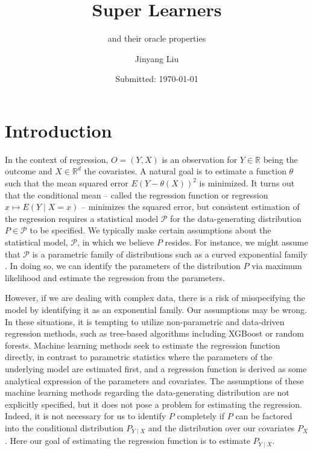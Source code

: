 \documentclass[11pt, a4paper]{article}
\author{Jinyang Liu}
\title{Super Learners}
\subtitle{and their oracle properties}
\date{Submitted: \today}
\theoremstyle{definition}
\theoremstyle{remark}
\begin{document}
\begingroup
    \selectfont %
    \maketitle
    \thispagestyle{empty} 
    
    \newpage
    \thispagestyle{empty} 
    
    \newpage
    \thispagestyle{empty} 
    \tableofcontents
    \newpage
\endgroup

\pagestyle{fancy}
\section{Introduction}
In the context of regression, $ O = (Y, X) $ is an observation for $ Y \in \mathbb{R} $ being the outcome and $ X \in \mathbb{R}^{d} $ the covariates. A natural goal is to estimate a function $ \theta $ such that the mean squared error $ E(Y - \theta(X))^2 $ is minimized. It turns out that the conditional mean -- called the regression function or regression $ x \mapsto E(Y \mid X = x) $ -- minimizes the squared error, but consistent estimation of the regression requires a statistical model $ \mathcal{P} $ for the data-generating distribution $ P \in \mathcal{P} $ to be specified. We typically make certain assumptions about the statistical model, $\mathcal{P}$, in which we believe $P$ resides. For instance, we might assume that $\mathcal{P}$ is a parametric family of distributions such as a curved exponential family \parencite{lauritzen2023fundamentals}. In doing so, we can identify the parameters of the distribution $ P $ via maximum likelihood and estimate the regression from the parameters.

However, if we are dealing with complex data, there is a risk of misspecifying the model by identifying it as an exponential family. Our assumptions may be wrong. In these situations, it is tempting to utilize non-parametric and data-driven regression methods, such as tree-based algorithms including XGBoost or random forests. Machine learning methods seek to estimate the regression function directly, in contrast to parametric statistics where the parameters of the underlying model are estimated first, and a regression function is derived as some analytical expression of the parameters and covariates. The assumptions of these machine learning methods regarding the data-generating distribution are not explicitly specified, but it does not pose a problem for estimating the regression. Indeed, it is not necessary for us to identify $ P $ completely if $ P $ can be factored into the conditional distribution $ P_{Y \mid X} $ and the distribution over our covariates $ P_X $. Here our goal of estimating the regression function is to estimate $ P_{Y \mid X} $.   
\end{document}
